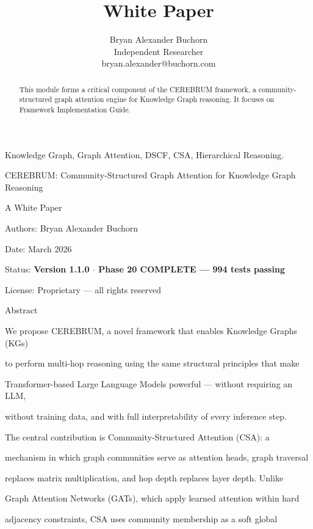 \documentclass[10pt,journal,compsoc]{IEEEtran}
\begin{document}
\title{White Paper}
\author{Bryan Alexander Buchorn \\ Independent Researcher \\ bryan.alexander@buchorn.com}

\maketitle

\begin{abstract}
This module forms a critical component of the CEREBRUM framework, a community-structured graph attention engine for Knowledge Graph reasoning. It focuses on Framework Implementation Guide.
\end{abstract}

\begin{IEEEkeywords}
Knowledge Graph, Graph Attention, DSCF, CSA, Hierarchical Reasoning.
\end{IEEEkeywords}

CEREBRUM: Community-Structured Graph Attention for Knowledge Graph Reasoning

A White Paper

Authors: Bryan Alexander Buchorn

Date: March 2026

Status: \textbf{Version 1.1.0 $\cdot$ Phase 20 COMPLETE — 994 tests passing}

License: Proprietary — all rights reserved

Abstract

We propose CEREBRUM, a novel framework that enables Knowledge Graphs (KGs)

to perform multi-hop reasoning using the same structural principles that make

Transformer-based Large Language Models powerful — without requiring an LLM,

without training data, and with full inter\-pretability of every inference step.

The central contr\-ibution is Community-Structured Attention (CSA): a

mechanism in which graph communities serve as attention heads, graph traversal

replaces matrix multi\-plication, and hop depth replaces layer depth. Unlike

Graph Attention Networks (GATs), which apply learned attention within hard

adjacency constraints, CSA uses community membership as a soft global
\end{document}
